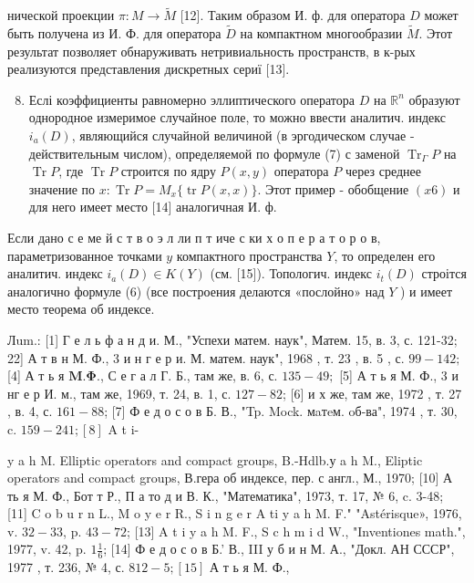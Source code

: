 \documentclass[10pt]{article}
\begin{document}
нической проекции $\pi: M \rightarrow \tilde{M}$ [12]. Таким образом И. ф. для оператора $D$ может быть получена из И. Ф. для оператора $\tilde{D}$ на компактном многообразии $\tilde{M}$. Этот результат позволяет обнаруживать нетривиальность пространств, в к-рых реализуются представления дискретных сериї [13].



\begin{enumerate}

  \setcounter{enumi}{7}

  \item Еслі коэффициенты равномерно эллиптического оператора $D$ на $\mathbb{R}^{n}$ образуют однородное измеримое случайное поле, то можно ввести аналитич. индекс $i_{a}(D)$, являющийся случайной величиной (в эргодическом случае - действительным числом), определяемой по формуле (7) с заменой $\operatorname{Tr}_{\Gamma} P$ на $\operatorname{Tr} P$, где $\operatorname{Tr} P$ строится по ядру $P(x, y)$ оператора $P$ через среднее значение по $x: \operatorname{Tr} P=M_{x}\{\operatorname{tr} P(x, x)\}$. Этот пример - обобщение $(x 6)$ и для него имеет место [14] аналогичная И. ф.

\end{enumerate}



Если дано с е ме й с т в о э л ли п т иче с ки х о п е р а т о р о в, параметризованное точками $y$ компактного пространства $Y$, то определен его аналитич. индекс $i_{a}(D) \in K(Y)$ (см. [15]). Топологич. индекс $i_{t}(D)$ строітся аналогично формуле (6) (все построения делаются «послойно» над $Y$ ) и имеет место теорема об индексе.



Лum.: [1] Г е л ь ф а н д и. М., "Успехи матем. наук", Матем. 15, в. 3, с. 121-32; 22] А т в н М. Ф., 3 и н г е р и. М. матем. наук", 1968 , т. 23 , в. 5 , с. $99-142 ;$ [4] А т ь я $\mathbf{M} . \boldsymbol{\Phi} .$, С е г а л Г. Б., там же, в. 6, с. $135-49 ;$ [5] А т ь я М. Ф., 3 и нг е р И. м., там же, 1969, т. 24, в. 1, с. $127-82$; [6] и х же, там же, 1972 , т. 27 , в. 4, с. $161-88$; [7] Ф е д о с о в Б. В., "Tp. Mock. мaтeм. oб-ва", 1974 , т. 30, c. $159-241 ;[8]$ A t i-

y a h M. Elliptic operators and compact groups, B.-Hdlb.у a h M., Eliptic operators and compact groups, В.гера об индексе, пер. с англ., М., 1970; [10] А ть я М. Ф., Бот т Р., П а то д и В. К., "Математика", 1973, т. 17, № 6, c. 3-48; [11] C o b u r n L., M o y e r R., S i n g e r A ti y a h M. F." "Astérisque», 1976, v. $32-33$, p. $43-72$; [13] A t i y a h M. F., S c h m i d W., "Inventiones math.", 1977, v. 42, p. $1 \frac{1}{6}$; [14] Ф е д о с о в Б.' В., III у б и н М. А., "Докл. АН СССР", 1977 , т. 236, № 4, с. $812-5 ;[15]$ А т ь я М. Ф.,
\end{document}
